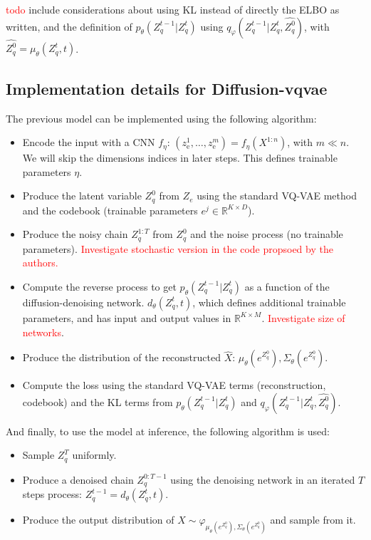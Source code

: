 \documentclass{article}
\newcommand{\rset}{\ensuremath{\mathbb{R}}}
\newcommand{\rme}{\mathrm{e}}
\begin{document}
\textcolor{red}{todo} include considerations about using KL instead of directly the ELBO as written, and the definition of $p_{\theta}(Z_q^{t-1}|Z_q^t)$ using $q_\varphi(Z_q^{t-1}|Z_q^t, \hat{Z_q^0})$, with $\hat{Z_q^0} = \mu_\theta(Z_q^t, t)$.

\subsection{Implementation details for Diffusion-vqvae}
The previous model can be implemented using the following algorithm:

\begin{itemize}
	\item Encode the input with a CNN $f_\eta$: $(z_\rme^1,\ldots, z_\rme^m) = f_\eta(X^{1:n})$, with $m \ll n$. We will skip the dimensions indices in later steps. This defines trainable parameters $\eta$.
	\item Produce the latent variable $Z_q^0$ from $Z_e$ using the standard VQ-VAE method and the codebook (trainable parameters $e^j \in \rset^{K \times D}$).
	\item Produce the noisy chain $Z_q^{1:T}$ from $Z_q^0$ and the noise process (no trainable parameters). \textcolor{red}{Investigate stochastic version in the code propsoed by the authors.}
	\item Compute the reverse process to get $p_\theta(Z_q^{t-1}|Z_q^t)$ as a function of the diffusion-denoising network. $d_\theta(Z_q^t, t)$, which defines additional trainable parameters, and has input and output values in $\rset^{K \times M}$. \textcolor{red}{Investigate size of networks}.
	\item Produce the distribution of the reconstructed $\hat{X}$: $\mu_\theta(e^{Z_q^0}),\Sigma_\theta(e^{Z_q^0})$.
	\item Compute the loss using the standard VQ-VAE terms (reconstruction, codebook) and the KL terms from $p_\theta(Z_q^{t-1}|Z_q^t)$ and $q_\varphi(Z_q^{t-1}|Z_q^t, \hat{Z_q^0})$.
\end{itemize}

And finally, to use the model at inference, the following algorithm is used:
\begin{itemize}
	\item Sample $Z_q^T$ uniformly.
	\item Produce a denoised chain $Z_q^{0:T-1}$ using the denoising network in an iterated $T$ steps process: $Z_q^{t-1} = d_\theta(Z_q^t, t)$.
	\item Produce the output distribution of $\hat{X} \sim \varphi_{\mu_\theta(e^{Z_q^0}),\Sigma_\theta(e^{Z_q^0})}$ and sample from it.
\end{itemize}
\end{document}
